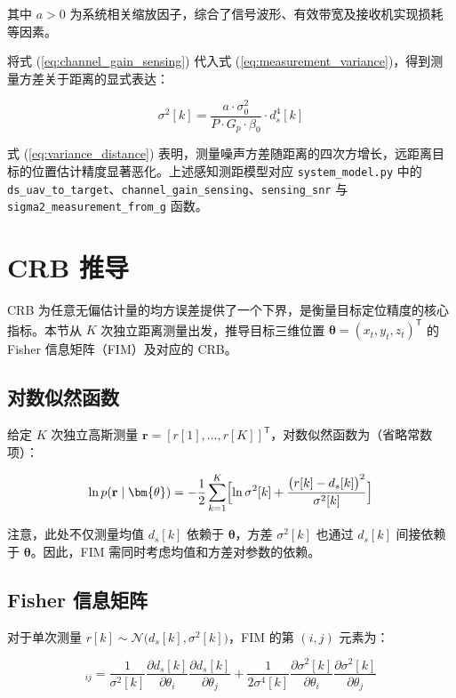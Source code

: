其中 $a>0$ 为系统相关缩放因子，综合了信号波形、有效带宽及接收机实现损耗等因素。

将式 (\ref{eq:channel_gain_sensing}) 代入式 (\ref{eq:measurement_variance})，得到测量方差关于距离的显式表达：

\begin{equation}
\sigma^2[k]=\frac{a\cdot\sigma_0^2}{P\cdot G_p\cdot\beta_0}\cdot d_s^4[k]
\label{eq:variance_distance}
\end{equation}

式 (\ref{eq:variance_distance}) 表明，测量噪声方差随距离的四次方增长，远距离目标的位置估计精度显著恶化。上述感知测距模型对应 \texttt{system\_model.py} 中的 \texttt{ds\_uav\_to\_target}、\texttt{channel\_gain\_sensing}、\texttt{sensing\_snr} 与 \texttt{sigma2\_measurement\_from\_g} 函数。

\section{CRB 推导}

CRB 为任意无偏估计量的均方误差提供了一个下界，是衡量目标定位精度的核心指标。本节从 $K$ 次独立距离测量出发，推导目标三维位置 $\bm{\theta}=(x_t, y_t, z_t)^{\mathsf{T}}$ 的 Fisher 信息矩阵（FIM）及对应的 CRB。

\subsection{对数似然函数}

给定 $K$ 次独立高斯测量 $\mathbf{r}=[r[1],\ldots,r[K]]^{\mathsf{T}}$，对数似然函数为（省略常数项）：

\begin{equation}
\ln p(\mathbf{r}\mid\bm{\theta})=-\frac{1}{2}\sum_{k=1}^{K}\Bigl[\ln\sigma^2[k]+\frac{\bigl(r[k]-d_s[k]\bigr)^2}{\sigma^2[k]}\Bigr]
\label{eq:log_likelihood}
\end{equation}

注意，此处不仅测量均值 $d_s[k]$ 依赖于 $\bm{\theta}$，方差 $\sigma^2[k]$ 也通过 $d_s[k]$ 间接依赖于 $\bm{\theta}$。因此，FIM 需同时考虑均值和方差对参数的依赖。

\subsection{Fisher 信息矩阵}

对于单次测量 $r[k]\sim\mathcal{N}\bigl(d_s[k],\sigma^2[k]\bigr)$，FIM 的第 $(i,j)$ 元素为\cite{Kay1993}：

\begin{equation}
[\mathbf{F}_k]_{ij}=\frac{1}{\sigma^2[k]}\frac{\partial d_s[k]}{\partial\theta_i}\frac{\partial d_s[k]}{\partial\theta_j}
+\frac{1}{2\sigma^4[k]}\frac{\partial\sigma^2[k]}{\partial\theta_i}\frac{\partial\sigma^2[k]}{\partial\theta_j}
\label{eq:fim_element}
\end{equation}

